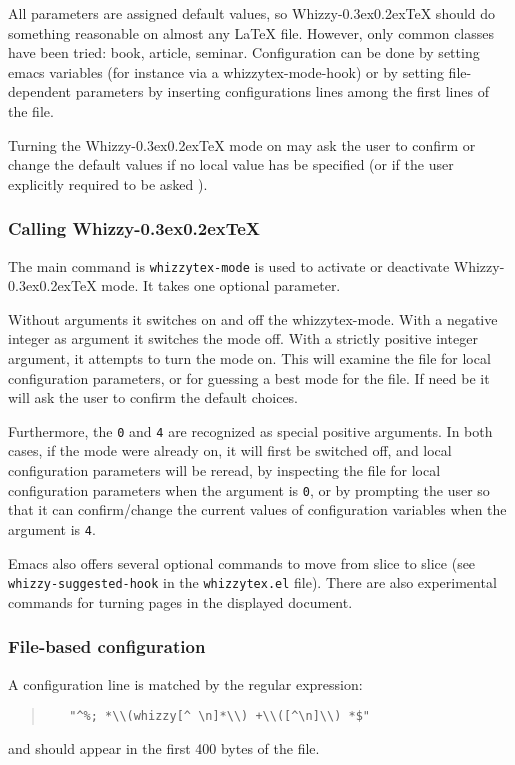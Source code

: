 \documentclass{article}
\makeatletter
\let \lst \verb
\def \whizzy {{Whizzy\kern -0.3ex\raise 0.2ex\hbox{\let \@\relax\TeX}}}
\makeatother
\begin{document}
All parameters are assigned default values, so {\whizzy} should do something
reasonable on almost any {\LaTeX} file. However, only common classes have
been tried: book, article, seminar. 
Configuration can be done by setting emacs variables (for instance via a
whizzytex-mode-hook) or by setting file-dependent parameters by 
inserting configurations lines among the first lines of the file.

Turning the {\whizzy} mode on may ask the user to confirm or change the
default values if no local value has be specified 
(or if the user explicitly required to be asked
).


\subsubsection {Calling {\whizzy}}

The main command is \lst"whizzytex-mode" is used to activate or deactivate 
{\whizzy} mode. It takes one optional parameter. 

Without arguments it switches on and off the whizzytex-mode. With a negative
integer as argument it switches the mode off. With a strictly positive
integer argument, it attempts to turn the mode on.  This will examine the
file for local configuration parameters, or for guessing a best mode for the
file. If need be it will ask the user to confirm the default choices.

Furthermore, the \lst"0" and \lst"4" are recognized as special positive
arguments. In both cases, if the mode were already on, it will first be
switched off, and local configuration parameters will be reread, by
inspecting the file for local configuration parameters when the argument is
\lst"0", or by prompting the user so that it can confirm/change the current
values of configuration variables when the argument is \lst"4".

Emacs also offers several optional commands to move from slice to slice
(see \lst"whizzy-suggested-hook" in the \lst"whizzytex.el" file). 
There are also experimental commands for turning pages in the displayed
document. 


\subsubsection {File-based configuration}

A configuration line is matched by the regular expression:
\begin{quote}
\begin{verbatim}
   "^%; *\\(whizzy[^ \n]*\\) +\\([^\n]\\) *$"
\end{verbatim}%
\end{quote}
and should appear in the first 400 bytes of the file. 
\end{document}
